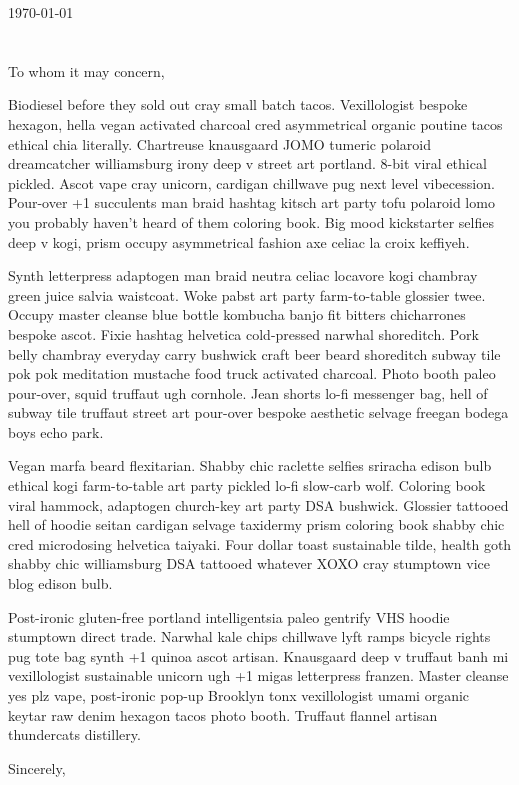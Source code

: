 \documentclass{../src/middletter}
\begin{document}
 

\begin{letter}{} %
\opening{\vspace{-3em}\today \\ \\ \\ To whom it may concern,\\} 


Biodiesel before they sold out cray small batch tacos. Vexillologist bespoke hexagon, hella vegan activated charcoal cred asymmetrical organic poutine tacos ethical chia literally. Chartreuse knausgaard JOMO tumeric polaroid dreamcatcher williamsburg irony deep v street art portland. 8-bit viral ethical pickled. Ascot vape cray unicorn, cardigan chillwave pug next level vibecession. Pour-over +1 succulents man braid hashtag kitsch art party tofu polaroid lomo you probably haven't heard of them coloring book. Big mood kickstarter selfies deep v kogi, prism occupy asymmetrical fashion axe celiac la croix keffiyeh.

Synth letterpress adaptogen man braid neutra celiac locavore kogi chambray green juice salvia waistcoat. Woke pabst art party farm-to-table glossier twee. Occupy master cleanse blue bottle kombucha banjo fit bitters chicharrones bespoke ascot. Fixie hashtag helvetica cold-pressed narwhal shoreditch. Pork belly chambray everyday carry bushwick craft beer beard shoreditch subway tile pok pok meditation mustache food truck activated charcoal. Photo booth paleo pour-over, squid truffaut ugh cornhole. Jean shorts lo-fi messenger bag, hell of subway tile truffaut street art pour-over bespoke aesthetic selvage freegan bodega boys echo park.

Vegan marfa beard flexitarian. Shabby chic raclette selfies sriracha edison bulb ethical kogi farm-to-table art party pickled lo-fi slow-carb wolf. Coloring book viral hammock, adaptogen church-key art party DSA bushwick. Glossier tattooed hell of hoodie seitan cardigan selvage taxidermy prism coloring book shabby chic cred microdosing helvetica taiyaki. Four dollar toast sustainable tilde, health goth shabby chic williamsburg DSA tattooed whatever XOXO cray stumptown vice blog edison bulb. 
 
Post-ironic gluten-free portland intelligentsia paleo gentrify VHS hoodie stumptown direct trade. Narwhal kale chips chillwave lyft ramps bicycle rights pug tote bag synth +1 quinoa ascot artisan. Knausgaard deep v truffaut banh mi vexillologist sustainable unicorn ugh +1 migas letterpress franzen. Master cleanse yes plz vape, post-ironic pop-up Brooklyn tonx vexillologist umami organic keytar raw denim hexagon tacos photo booth. Truffaut flannel artisan thundercats distillery. 

\closing{Sincerely,}
    
\end{letter}
\end{document}
